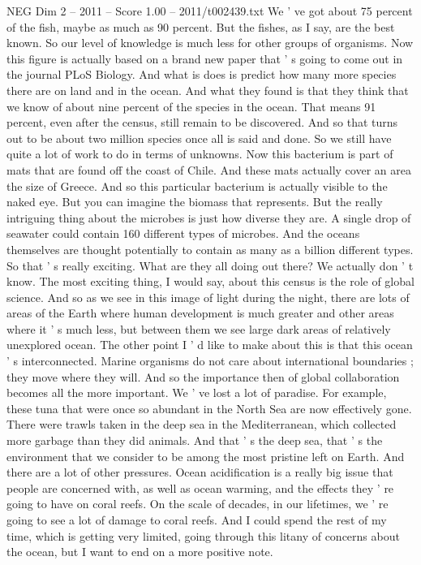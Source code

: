 \begin{textsample}{NEG Dim 2 – 2011 – Score 1.00 – 2011/t002439.txt}
We ' ve got about 75 percent of the fish, maybe as much as 90 percent.
But the fishes, as I say, are the best known.
So our level of knowledge is much less for other groups of organisms.
Now this figure is actually based on a brand new paper that ' s going to come out in the journal PLoS Biology.
And what is does is predict how many more species there are on land and in the ocean.
And what they found is that they think that we know of about nine percent of the species in the ocean.
That means 91 percent, even after the census, still remain to be discovered.
And so that turns out to be about two million species once all is said and done.
So we still have quite a lot of work to do in terms of unknowns.
Now this bacterium is part of mats that are found off the coast of Chile.
And these mats actually cover an area the size of Greece.
And so this particular bacterium is actually visible to the naked eye.
But you can imagine the biomass that represents.
But the really intriguing thing about the microbes is just how diverse they are.
A single drop of seawater could contain 160 different types of microbes.
And the oceans themselves are thought potentially to contain as many as a billion different types.
So that ' s really exciting.
What are they all doing out there?
We actually don ' t know.
The most exciting thing, I would say, about this census is the role of global science.
And so as we see in this image of light during the night, there are lots of areas of the Earth where human development is much greater and other areas where it ' s much less, but between them we see large dark areas of relatively unexplored ocean.
The other point I ' d like to make about this is that this ocean ' s interconnected.
Marine organisms do not care about international boundaries ; they move where they will.
And so the importance then of global collaboration becomes all the more important.
We ' ve lost a lot of paradise.
For example, these tuna that were once so abundant in the North Sea are now effectively gone.
There were trawls taken in the deep sea in the Mediterranean, which collected more garbage than they did animals.
And that ' s the deep sea, that ' s the environment that we consider to be among the most pristine left on Earth.
And there are a lot of other pressures.
Ocean acidification is a really big issue that people are concerned with, as well as ocean warming, and the effects they ' re going to have on coral reefs.
On the scale of decades, in our lifetimes, we ' re going to see a lot of damage to coral reefs.
And I could spend the rest of my time, which is getting very limited, going through this litany of concerns about the ocean, but I want to end on a more positive note.

\end{textsample}
